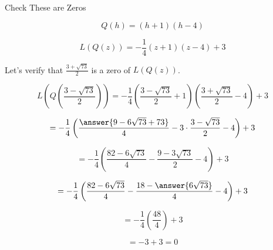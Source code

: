 \documentclass{ximera}
\begin{document}
\begin{claim} Check These are Zeros


\[   Q(h) = (h+1)(h-4)   \]


\[   L(Q(z)) = -\frac{1}{4} (z+1)(z-4) + 3   \]


Let's verify that $\frac{3 + \sqrt{73}}{2}$ is a zero of $L(Q(z))$.



\[   L \left( Q \left( \frac{3 - \sqrt{73}}{2} \right) \right) = -\frac{1}{4} \left( \frac{3 - \sqrt{73}}{2}+1 \right) \left( \frac{3 + \sqrt{73}}{2}-4 \right) + 3    \]



\[  = -\frac{1}{4} \left( \frac{\answer{9 - 6 \sqrt{73} + 73}}{4} - 3 \cdot \frac{3 - \sqrt{73}}{2} - 4 \right) + 3    \]


\[  = -\frac{1}{4} \left( \frac{82 - 6 \sqrt{73}}{4} - \frac{9 - 3 \sqrt{73}}{2} - 4 \right) + 3    \]


\[  = -\frac{1}{4} \left( \frac{82 - 6 \sqrt{73}}{4} - \frac{18 - \answer{6 \sqrt{73}}}{4} - 4 \right) + 3    \]


\[  = -\frac{1}{4} \left( \frac{48}{4} \right) + 3    \]


\[  = -3 + 3   = 0 \]


\end{claim}
\end{document}

